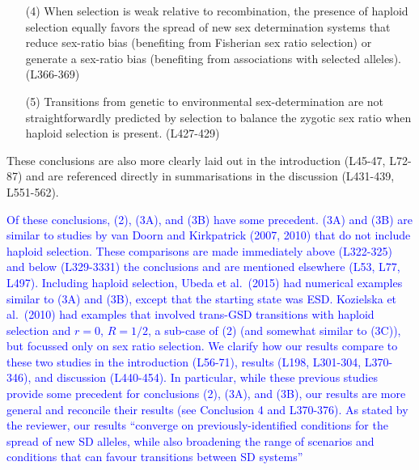 \documentclass[10pt,letterpaper]{article}
\begin{document}
{\begin{enumerate}
\item[(4)] When selection is weak relative to recombination, the presence of haploid selection equally favors the spread of new sex determination systems that reduce sex-ratio bias (benefiting from Fisherian sex ratio selection) or generate a sex-ratio bias (benefiting from associations with selected alleles). (L366-369)
\item[(5)] Transitions from genetic to environmental sex-determination are not straightforwardly predicted by selection to balance the zygotic sex ratio when haploid selection is present.  (L427-429)
\end{enumerate}
These conclusions are also more clearly laid out in the introduction (L45-47, L72-87) and are referenced directly in summarisations in the discussion (L431-439, L551-562). 
}

\textcolor{blue}{Of these conclusions, (2), (3A), and (3B) have some precedent. 
(3A) and (3B) are similar to studies by van Doorn and Kirkpatrick (2007, 2010) that do not include haploid selection. These comparisons are made immediately above (L322-325) and below (L329-3331) the conclusions and are mentioned elsewhere (L53, L77, L497). 
Including haploid selection, Ubeda et al.\ (2015) had numerical examples similar to (3A) and (3B), except that the starting state was ESD. 
Kozielska et al.\ (2010) had examples that involved trans-GSD transitions with haploid selection and $r=0$, $R=1/2$, a sub-case of (2) (and somewhat similar to (3C)), but focussed only on sex ratio selection. 
We clarify how our results compare to these two studies in the introduction (L56-71), results (L198, L301-304, L370-346), and discussion (L440-454).
In particular, while these previous studies provide some precedent for conclusions (2), (3A), and (3B), our results are more general and reconcile their results (see Conclusion 4 and L370-376). 
As stated by the reviewer, our results ``converge on previously-identified conditions for the spread of new SD alleles, while also broadening the range of scenarios and conditions that can favour transitions between SD systems''}
\end{document}
